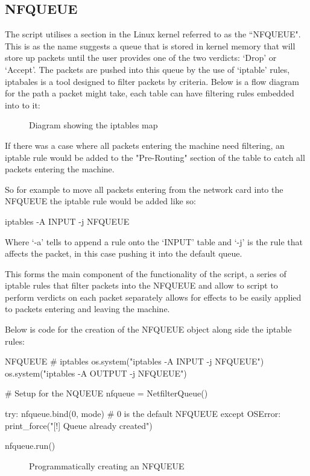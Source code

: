 \subsection{NFQUEUE}
The script utilises a section in the Linux kernel referred to as the ``NFQUEUE". This is as the name suggests a queue that is stored in kernel memory that will store up packets until the user provides one of the two verdicts: `Drop' or `Accept'. The packets are pushed into this queue by the use of `iptable' rules, iptabales is a tool designed to filter packets by criteria. Below is a flow diagram for the path a packet might take, each table can have filtering rules embedded into to it:


\begin{figure}[h]
	\caption{Diagram showing the iptables map}
	\label{ref:iptables}
\end{figure}

If there was a case where all packets entering the machine need filtering, an iptable rule would be added to the "Pre-Routing" section of the table to catch all packets entering the machine. 

So for example to move all packets entering from the network card into the NFQUEUE the iptable rule would be added like so:
\begin{center}
	\begin{console_font}
		\large{iptables -A INPUT -j NFQUEUE}
	\end{console_font} 
\end{center}
Where `-a' tells to append a rule onto the `INPUT' table and `-j' is the rule that affects the packet, in this case pushing it into the default queue.

This forms the main component of the functionality of the script, a series of iptable rules that filter packets into the NFQUEUE and allow to script to perform verdicts on each packet separately allows for effects to be easily applied to packets entering and leaving the machine.

Below is code for the creation of the NFQUEUE object along side the iptable rules:
\begin{Code}[]{NFQUEUE}
# iptables
os.system("iptables -A INPUT -j NFQUEUE")
os.system("iptables -A OUTPUT -j NFQUEUE")

# Setup for the NQUEUE
nfqueue = NetfilterQueue()

try:
	nfqueue.bind(0, mode)  # 0 is the default NFQUEUE
except OSError:
	print_force("[!] Queue already created")
	
nfqueue.run()
\end{Code}
\begin{figure}[h]
	\caption{Programmatically creating an NFQUEUE}
\end{figure}

